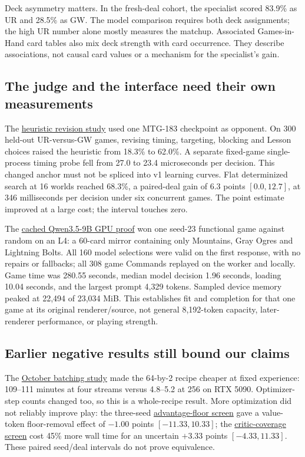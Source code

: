 \documentclass[11pt]{article}
\newcommand{\source}[2]{\href{https://github.com/loopflowstudio/manabot/blob/558e0186b585228dd2130cf14d9cb40de217e66f/#1}{#2}}
\newcommand{\report}[2]{\source{experiments/#1}{#2}}
\begin{document}
Deck asymmetry matters. In the fresh-deal cohort, the specialist scored 83.9\% as UR and 28.5\% as GW. The model comparison requires both deck assignments; the high UR number alone mostly measures the matchup. Associated Games-in-Hand card tables also mix deck strength with card occurrence. They describe associations, not causal card values or a mechanism for the specialist's gain.

\subsection{The judge and the interface need their own measurements}

The \report{heuristic-strength.md}{heuristic revision study} used one MTG-183 checkpoint as opponent. On 300 held-out UR-versus-GW games, revising timing, targeting, blocking and Lesson choices raised the heuristic from 18.3\% to 62.0\%. A separate fixed-game single-process timing probe fell from 27.0 to 23.4 microseconds per decision. This changed anchor must not be spliced into v1 learning curves. Flat determinized search at 16 worlds reached 68.3\%, a paired-deal gain of 6.3 points $[0.0,12.7]$, at 346 milliseconds per decision under six concurrent games. The point estimate improved at a large cost; the interval touches zero.

The \source{docs/llm-harness.md}{cached Qwen3.5-9B GPU proof} won one seed-23 functional game against random on an L4: a 60-card mirror containing only Mountains, Gray Ogres and Lightning Bolts. All 160 model selections were valid on the first response, with no repairs or fallbacks; all 308 game Commands replayed on the worker and locally. Game time was 280.55 seconds, median model decision 1.96 seconds, loading 10.04 seconds, and the largest prompt 4,329 tokens. Sampled device memory peaked at 22,494 of 23,034 MiB. This establishes fit and completion for that one game at its original renderer/source, not general 8,192-token capacity, later-renderer performance, or playing strength.

\subsection{Earlier negative results still bound our claims}

The \report{longer-learning-017.md}{October batching study} made the 64-by-2 recipe cheaper at fixed experience: 109--111 minutes at four streams versus 4.8--5.2 at 256 on RTX 5090. Optimizer-step counts changed too, so this is a whole-recipe result. More optimization did not reliably improve play: the three-seed \report{pooling-filter-followup.md}{advantage-floor screen} gave a value-token floor-removal effect of $-1.00$ points $[-11.33,10.33]$; the \report{ataraxos-technique-screen.md}{critic-coverage screen} cost 45\% more wall time for an uncertain $+3.33$ points $[-4.33,11.33]$. These paired seed/deal intervals do not prove equivalence.
\end{document}
